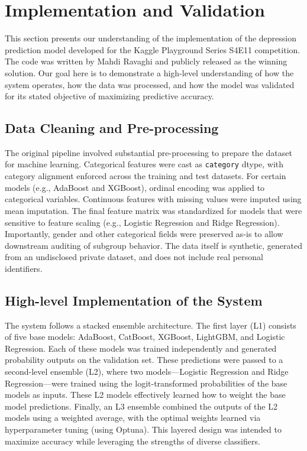 \chapter{Implementation and Validation}

This section presents our understanding of the implementation of the depression prediction model developed for the Kaggle Playground Series S4E11 competition. The code was written by Mahdi Ravaghi and publicly released as the winning solution. Our goal here is to demonstrate a high-level understanding of how the system operates, how the data was processed, and how the model was validated for its stated objective of maximizing predictive accuracy.

\section{Data Cleaning and Pre-processing}

The original pipeline involved substantial pre-processing to prepare the dataset for machine learning. Categorical features were cast as \texttt{category} dtype, with category alignment enforced across the training and test datasets. For certain models (e.g., AdaBoost and XGBoost), ordinal encoding was applied to categorical variables. Continuous features with missing values were imputed using mean imputation. The final feature matrix was standardized for models that were sensitive to feature scaling (e.g., Logistic Regression and Ridge Regression). Importantly, gender and other categorical fields were preserved as-is to allow downstream auditing of subgroup behavior. The data itself is synthetic, generated from an undisclosed private dataset, and does not include real personal identifiers.

\section{High-level Implementation of the System}

The system follows a stacked ensemble architecture. The first layer (L1) consists of five base models: AdaBoost, CatBoost, XGBoost, LightGBM, and Logistic Regression. Each of these models was trained independently and generated probability outputs on the validation set. These predictions were passed to a second-level ensemble (L2), where two models—Logistic Regression and Ridge Regression—were trained using the logit-transformed probabilities of the base models as inputs. These L2 models effectively learned how to weight the base model predictions. Finally, an L3 ensemble combined the outputs of the L2 models using a weighted average, with the optimal weights learned via hyperparameter tuning (using Optuna). This layered design was intended to maximize accuracy while leveraging the strengths of diverse classifiers.

